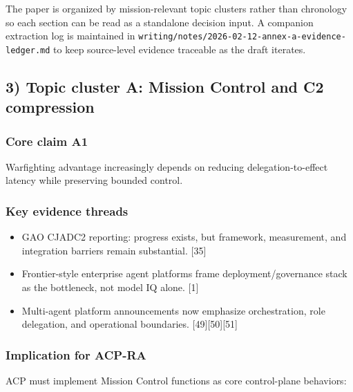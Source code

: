 \documentclass[11pt]{article}
\begin{document}
The paper is organized by mission-relevant topic clusters rather than
chronology so each section can be read as a standalone decision input. A
companion extraction log is maintained in
\texttt{writing/notes/2026-02-12-annex-a-evidence-ledger.md} to keep
source-level evidence traceable as the draft iterates.

\hypertarget{topic-cluster-a-mission-control-and-c2-compression}{%
\subsection{3) Topic cluster A: Mission Control and C2
compression}\label{topic-cluster-a-mission-control-and-c2-compression}}

\hypertarget{core-claim-a1}{%
\subsubsection{Core claim A1}\label{core-claim-a1}}

Warfighting advantage increasingly depends on reducing
delegation-to-effect latency while preserving bounded control.

\hypertarget{key-evidence-threads}{%
\subsubsection{Key evidence threads}\label{key-evidence-threads}}

\begin{itemize}
\tightlist
\item
  GAO CJADC2 reporting: progress exists, but framework, measurement, and
  integration barriers remain substantial. {[}35{]}
\item
  Frontier-style enterprise agent platforms frame deployment/governance
  stack as the bottleneck, not model IQ alone. {[}1{]}
\item
  Multi-agent platform announcements now emphasize orchestration, role
  delegation, and operational boundaries. {[}49{]}{[}50{]}{[}51{]}
\end{itemize}

\hypertarget{implication-for-acp-ra}{%
\subsubsection{Implication for ACP-RA}\label{implication-for-acp-ra}}

ACP must implement Mission Control functions as core control-plane
behaviors:
\end{document}
